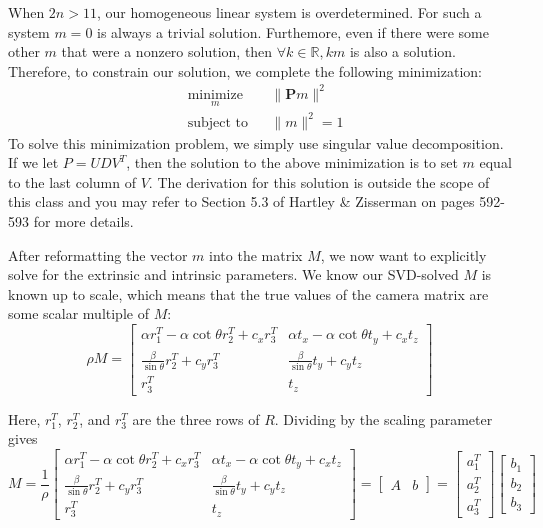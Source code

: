 \documentclass[a4paper, 12pt]{article}
\begin{document}
When $2n > 11$, our homogeneous linear system is overdetermined. For such a system $m=0$ is always a trivial solution. Furthemore, even if there were some other $m$ that were a nonzero solution, then $\forall k\in \mathbb{R},km$ is also a solution. Therefore, to constrain our solution, we complete the following minimization:
\begin{equation}
\begin{aligned}
    & \underset{m}{\text{minimize}}
    & & \|\mathbf{P}m\|^2 \\
    & \text{subject to}
    & & \|m\|^2 = 1
\end{aligned}
\end{equation}
To solve this minimization problem, we simply use singular value decomposition. If we let $P = UDV^T$, then the solution to the above minimization is to set $m$ equal to the last column of $V$. The derivation for this solution is outside the scope of this class and you may refer to Section 5.3 of Hartley \& Zisserman on pages 592-593 for more details.

After reformatting the vector $m$ into the matrix $M$, we now want to explicitly solve for the extrinsic and intrinsic parameters. We know our SVD-solved $M$ is known up to scale, which means that the true values of the camera matrix are some scalar multiple of $M$:
\begin{equation}
\rho M = \begin{bmatrix}
\alpha r_1^T - \alpha\cot \theta r_2^T + c_xr_3^T & \alpha t_x - \alpha \cot \theta t_y + c_x t_z \\
\frac{\beta}{\sin\theta}r_2^T + c_yr_3^T & \frac{\beta}{\sin\theta}t_y + c_yt_z \\ r_3^T & t_z
\end{bmatrix}
\end{equation}

Here, $r_1^T$, $r_2^T$, and $r_3^T$ are the three rows of $R$. Dividing by the scaling parameter gives
\[M = \frac{1}{\rho}\begin{bmatrix}
\alpha r_1^T - \alpha\cot \theta r_2^T + c_xr_3^T & \alpha t_x - \alpha \cot \theta t_y + c_x t_z \\
\frac{\beta}{\sin\theta}r_2^T + c_yr_3^T & \frac{\beta}{\sin\theta}t_y + c_yt_z \\ r_3^T & t_z
\end{bmatrix} = \begin{bmatrix}A & b\end{bmatrix} =\begin{bmatrix}
a_1^T \\ a_2^T \\ a_3^T
\end{bmatrix} \begin{bmatrix}
b_1\\b_2\\b_3
\end{bmatrix}
\]
\end{document}
